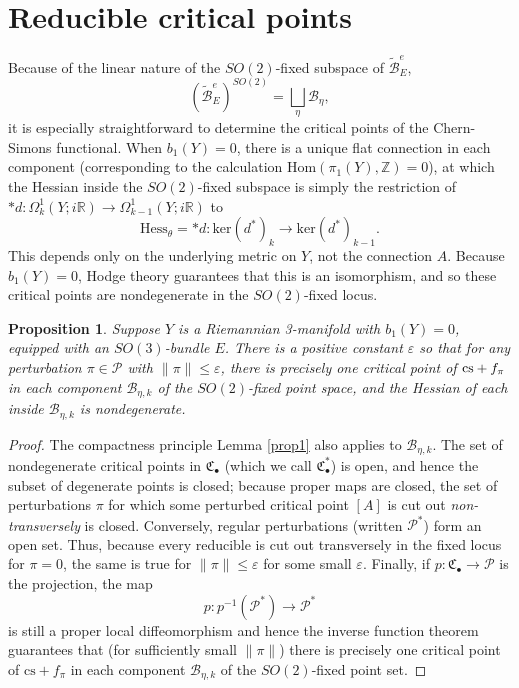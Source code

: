 \documentclass[10pt,a4paper]{amsart}
\newtheorem{proposition}[theorem]{Proposition}
\theoremstyle{definition}
\theoremstyle{remark}
\numberwithin{figure}{qchap}
\begin{document}
\section{Reducible critical points}\label{sec:3d-red}
Because of the linear nature of the $SO(2)$-fixed subspace of $\widetilde{\mathcal B}^e_E$, $$\left(\widetilde{\mathcal B}^e_E\right)^{SO(2)} = \bigsqcup_\eta \mathcal B_{\eta},$$ it is especially straightforward to determine the critical points of the Chern-Simons functional. When $b_1(Y) = 0$, there is a unique flat connection in each component (corresponding to the calculation $\text{Hom}(\pi_1(Y), \mathbb Z) = 0$), at which the Hessian inside the $SO(2)$-fixed subspace is simply the restriction of $*d: \Omega^1_k(Y;i\mathbb R) \to \Omega^1_{k-1}(Y;i\mathbb R)$ to $$\text{Hess}_\theta = *d: \text{ker}(d^*)_k \to \text{ker}(d^*)_{k-1}.$$ This depends only on the underlying metric on $Y$, not the connection $A$. Because $b_1(Y) = 0$, Hodge theory guarantees that this is an isomorphism, and so these critical points are nondegenerate in the $SO(2)$-fixed locus. 

\begin{proposition}\label{red1}Suppose $Y$ is a Riemannian 3-manifold with $b_1(Y) = 0$, equipped with an $SO(3)$-bundle $E$. There is a positive constant $\varepsilon$ so that for any perturbation $\pi \in \mathcal P$ with $\|\pi\| \leq \varepsilon$, there is precisely one critical point of $\textup{cs}+f_\pi$ in each component $\mathcal B_{\eta,k}$ of the $SO(2)$-fixed point space, and the Hessian of each inside $\mathcal B_{\eta, k}$ is nondegenerate. 
\end{proposition}

\begin{proof}The compactness principle Lemma \ref{prop1} also applies to $\mathcal B_{\eta, k}$. The set of nondegenerate critical points in $\mathfrak C_\bullet$ (which we call $\mathfrak C_\bullet^*$) is open, and hence the subset of degenerate points is closed; because proper maps are closed, the set of perturbations $\pi$ for which some perturbed critical point $[A]$ is cut out \textit{non-transversely} is closed. Conversely, regular perturbations (written $\mathcal P^*$) form an open set. Thus, because every reducible is cut out transversely in the fixed locus for $\pi = 0$, the same is true for $\|\pi\| \leq \varepsilon$ for some small $\varepsilon$. Finally, if $p: \mathfrak C_\bullet \to \mathcal P$ is the projection, the map 
$$p: p^{-1}(\mathcal P^*) \to \mathcal P^*$$
is still a proper local diffeomorphism and hence the inverse function theorem guarantees that (for sufficiently small $\|\pi\|$) there is precisely one critical point of $\text{cs}+f_\pi$ in each component $\mathcal B_{\eta, k}$ of the $SO(2)$-fixed point set.
\end{proof}
\end{document}
